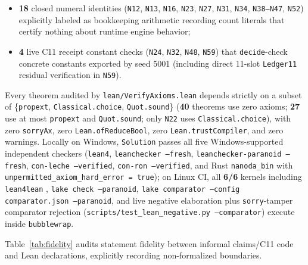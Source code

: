 \documentclass[11pt,reqno]{amsart}
\theoremstyle{remark}
\begin{document}
\begin{itemize}[leftmargin=1.8em, itemsep=1.5pt]
\begin{itemize}[leftmargin=1.4em, itemsep=1pt]
    \item \textbf{18} closed numeral identities (\texttt{N12}, \texttt{N13}, \texttt{N16}, \texttt{N23}, \texttt{N27}, \texttt{N31}, \texttt{N34}, \texttt{N38--N47}, \texttt{N52}) explicitly labeled as bookkeeping arithmetic recording count literals that certify nothing about runtime engine behavior;
    \item \textbf{4} live C11 receipt constant checks (\texttt{N24}, \texttt{N32}, \texttt{N48}, \texttt{N59}) that \texttt{decide}-check concrete constants exported by seed 5001 (including direct 11-slot \texttt{Ledger11} residual verification in \texttt{N59}).
  \end{itemize}
\end{itemize}

Every theorem audited by \texttt{lean/VerifyAxioms.lean} depends strictly on a subset of \{\texttt{propext}, \texttt{Classical.choice}, \texttt{Quot.sound}\} (\textbf{40} theorems use zero axioms; \textbf{27} use at most \texttt{propext} and \texttt{Quot.sound}; only \texttt{N22} uses \texttt{Classical.choice}), with zero \texttt{sorryAx}, zero \texttt{Lean.ofReduceBool}, zero \texttt{Lean.trustCompiler}, and zero warnings. Locally on Windows, \texttt{Solution} passes all five Windows-supported independent checkers (\texttt{lean4}, \texttt{leanchecker --fresh}, \texttt{leanchecker-paranoid --fresh}, \texttt{con-leche --verified}, \texttt{con-ron --verified}, and Rust \texttt{nanoda\_bin} with \texttt{unpermitted\_\allowbreak axiom\_\allowbreak hard\_\allowbreak error = true}); on Linux CI, all \textbf{6/6} kernels including \texttt{lean4lean} \cite{carneiro2024}, \texttt{lake check --paranoid}, \texttt{lake comparator --config comparator.json --paranoid}, and live negative elaboration plus \texttt{sorry}-tamper comparator rejection (\texttt{scripts/test\_lean\_negative.py --comparator}) execute inside \texttt{bubblewrap}.

Table~\ref{tab:fidelity} audits statement fidelity between informal claims/C11 code and Lean declarations, explicitly recording non-formalized boundaries.
\end{document}
